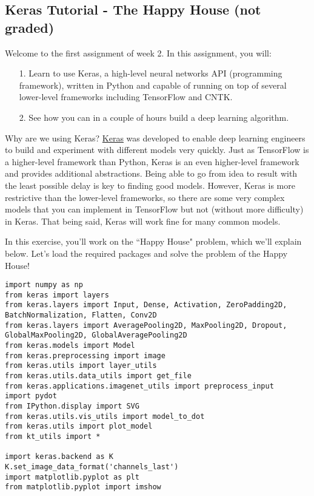 \subsection{Keras Tutorial - The Happy House (not graded)}

Welcome to the first assignment of week 2. In this assignment, you will:
\begin{itemize}
\item[1.] Learn to use Keras, a high-level neural networks API (programming framework), written in Python and capable of running on top of several lower-level frameworks including TensorFlow and CNTK.
\item[2.] See how you can in a couple of hours build a deep learning algorithm.
\end{itemize}

Why are we using Keras? \href{https://keras.io/}{Keras} was developed to enable deep learning engineers to build and experiment with different models very quickly. Just as TensorFlow is a higher-level framework than Python, Keras is an even higher-level framework and provides additional abstractions. Being able to go from idea to result with the least possible delay is key to finding good models. However, Keras is more restrictive than the lower-level frameworks, so there are some very complex models that you can implement in TensorFlow but not (without more difficulty) in Keras. That being said, Keras will work fine for many common models.

In this exercise, you'll work on the ``Happy House" problem, which we'll explain below. Let's load the required packages and solve the problem of the Happy House!
\begin{verbatim}
import numpy as np
from keras import layers
from keras.layers import Input, Dense, Activation, ZeroPadding2D, BatchNormalization, Flatten, Conv2D
from keras.layers import AveragePooling2D, MaxPooling2D, Dropout, GlobalMaxPooling2D, GlobalAveragePooling2D
from keras.models import Model
from keras.preprocessing import image
from keras.utils import layer_utils
from keras.utils.data_utils import get_file
from keras.applications.imagenet_utils import preprocess_input
import pydot
from IPython.display import SVG
from keras.utils.vis_utils import model_to_dot
from keras.utils import plot_model
from kt_utils import *

import keras.backend as K
K.set_image_data_format('channels_last')
import matplotlib.pyplot as plt
from matplotlib.pyplot import imshow
\end{verbatim}




